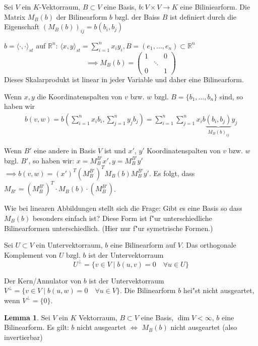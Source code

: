 \documentclass[oneside,fontsize=11pt,paper=a4,BCOR=0mm,DIV=12,automark,headsepline]{scrbook}
\newcommand{\gq}[1]{\glqq{}#1\grqq{}} %
\theoremstyle{remark}
\theoremstyle{definition}
\newtheorem{lemma}{Lemma}[section]
\theoremstyle{definition}
\theoremstyle{remark}
\begin{document}
\begin{definition}{}{}
  Sei $V$ ein $K$-Vektorraum, $B\subset V$ eine Basis, \(b: V\times V\to K\) eine Biliniearform.
  Die Matrix $M_B(b)$ der Bilinearform $b$ bzgl. der Baiss $B$ ist definiert
  durch die Eigenschaft $(M_B(b))_{ij}=b(b_i, b_j)$
\end{definition}
\begin{exa}
  \(b = \langle\cdot , \cdot\rangle_{st}\) auf \(\mathbb{R}^n\): \(\langle x, y\rangle_{st} = \sum_{i=1}^nx_i y_i, B = (e_1, \dots, e_n)\subset \mathbb{R}^n\) \[\implies M_B(b) =
    \begin{pmatrix}
      1 & & 0 \\
      &\ddots & \\
      0 & & 1
    \end{pmatrix}
\] Dieses Skalarprodukt ist linear in jeder Variable und daher eine Bilinearform.
\end{exa}
Wenn $x,y$ die Koordinatenspalten von $v$ bzw. $w$ bzgl. $B = \{b_1,\dots, b_n\}$ sind, so haben wir
\begin{align*}
  b(v,w) = b\left(\sum_{i=1}^nx_ib_i, \sum_{j=1}^ny_jb_j\right) = \sum_{i=1}^n\sum_{j=1}^nx_ib\underbrace{(b_i, b_j)}_{M_B(b)_{ij}}y_j
\end{align*}

Wenn $B'$ eine andere in Basis $V$ ist und $x'$, $y'$ Koordinatenspalten von $v$
bzw. $w$ bzgl. $B'$, so haben wir: $x=M_{B}^{B'}x', y = M_{B}^{B'}y'$  $\implies b(v,w)= (x')^T(M_B^{B'})^TM_B(b)M_B^{B'}y'$. Es
folgt, dass $M_{B'}= (M^{B'}_{B})^T\cdot M_B(b)\cdot (M^{B'}_{B})$.

Wie bei linearen Abbildungen stellt sich die Frage: \gq{Gibt es eine Basis so dass
$M_B(b)$ besonders einfach ist?} Diese Form ist f"ur unterschiedliche
Bilinearformen unterschiedlich. (Hier nur f"ur symetrische Formen.)

\begin{definition}{}{}
  Sei $U\subset V$ ein Untervektorraum, $b$ eine Bilinearform auf $V$. Das
  orthogonale Komplement von $U$ bzgl. $b$ ist der Untervektorraum \[U^\perp = \{v\in V\mid b(u, v) = 0\quad \forall u \in U\}\]

  Der Kern/Annulator von $b$ ist der Untervektorraum $V^\perp = \{v\in V \mid b(u, w) = 0 \quad \forall u\in V\}$. Die Bilinearform $b$ hei"st nicht ausgeartet, wenn \(V^\perp = \{0\}\).
\end{definition}

\begin{lemma}
  Sei $V$ ein $K$ Vektorraum, $B\subset V$ eine Basis, $\dim V < \infty$, $b$
  eine Bilinearform. Es gilt: $b$ nicht ausgeartet $\iff$ $M_B(b)$ nicht
  ausgeartet (also invertierbar)
\end{lemma}
\end{document}
